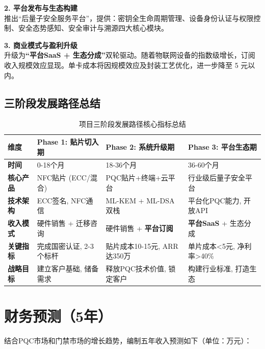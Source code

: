 \textbf{2. 平台发布与生态构建} \\
推出“后量子安全服务平台”，提供：密钥全生命周期管理、设备身份认证与权限控制、安全态势感知、安全审计与溯源四大核心模块。

\textbf{3. 商业模式与盈利升级} \\
升级为\textbf{“平台SaaS + 生态分成”}双轮驱动。随着物联网设备的指数级增长，订阅收入规模效应显现。单卡成本将因规模效应及封装工艺优化，进一步降至 5 元以内。

\subsection{三阶段发展路径总结}

\begin{table}[htbp]
	\centering
	\caption{项目三阶段发展路径核心指标总结}
	\label{tab:three_phases_summary}
	\renewcommand{\arraystretch}{1.4}
	\small
	\begin{tabular}{p{1.5cm}p{3.5cm}p{4cm}p{4.5cm}}
		\toprule
		\textbf{维度} & \textbf{Phase 1: 贴片切入期} & \textbf{Phase 2: 系统升级期} & \textbf{Phase 3: 平台生态期} \\
		\midrule
		\textbf{时间} & 0-18个月 & 18-36个月 & 36-60个月 \\
		\textbf{核心产品} & NFC贴片 (ECC/混合) & PQC贴片+终端+云平台 & 行业级后量子安全平台 \\
		\textbf{技术架构} & ECC签名, NFC通信 & ML-KEM + ML-DSA双栈 & 平台化PQC能力, 开放API \\
		\textbf{收入模式} & 硬件销售 + 迁移咨询 & 硬件销售 + \textbf{平台订阅} & \textbf{平台SaaS} + 生态分成 \\
		\textbf{关键指标} & 完成国密认证, 2-3个标杆 & 贴片成本10-15元, ARR达350万 & 单片成本<5元, 净利率>40\% \\
		\textbf{战略目标} & 建立客户基础, 储备需求 & 释放PQC技术价值, 锁定客户 & 构建行业标准, 打造生态 \\
		\bottomrule
	\end{tabular}
\end{table}

\section{财务预测（5年）}

结合PQC市场和门禁市场的增长趋势，编制五年收入预测如下（单位：万元）：

